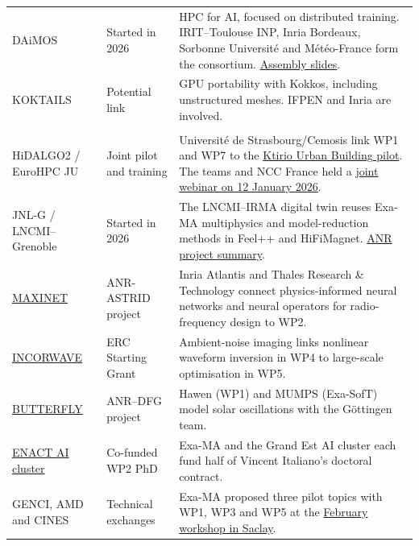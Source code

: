 \begin{longtable}{@{}
  >{\raggedright\arraybackslash}p{}
  >{\raggedright\arraybackslash}p{}
  >{\raggedright\arraybackslash}p{}@{}}
DAiMOS & Started in 2026 &
HPC for AI, focused on distributed training. IRIT--Toulouse INP,
Inria Bordeaux, Sorbonne Université and Météo-France form the
consortium. \href{https://numpex.org/wp-content/uploads/sites/6/2026/02/2026-01-21-2-DAIMOS.pdf}{Assembly
slides}.\\[1pt]

KOKTAILS & Potential link &
GPU portability with Kokkos, including unstructured meshes. IFPEN
and Inria are involved.\\

\addlinespace
\multicolumn{3}{@{}l@{}}{\textbf{Research programmes and facilities}}\\*
HiDALGO2 / EuroHPC JU & Joint pilot and training &
Université de Strasbourg/Cemosis link WP1 and WP7 to the \href{https://www.hidalgo2.eu/urban-building-model/}{Ktirio Urban
Building pilot}. The teams and NCC France held a
\href{https://exa-ma.numpex.fr/training.html}{joint webinar on 12 January 2026}.\\[1pt]

JNL-G / LNCMI--Grenoble & Started in 2026 &
The LNCMI--IRMA digital twin reuses Exa-MA multiphysics and
model-reduction methods in Feel++ and HiFiMagnet.
\href{https://anr.fr/Project-ANR-25-CE46-1157}{ANR project summary}.\\[1pt]

\href{https://anr.fr/Project-ANR-24-ASTR-0005}{MAXINET} & ANR-ASTRID project &
Inria Atlantis and Thales Research \& Technology connect physics-informed
neural networks and neural operators for radio-frequency design to WP2.\\[1pt]

\href{https://cordis.europa.eu/project/id/101116288}{INCORWAVE} &
ERC Starting Grant &
Ambient-noise imaging links nonlinear waveform inversion in WP4
to large-scale optimisation in WP5.\\[1pt]

\href{https://makutu.fr/fr/news/workshop-butterfly/}{BUTTERFLY} &
ANR--DFG project &
Hawen (WP1) and MUMPS (Exa-SofT) model solar oscillations
with the Göttingen team.\\[1pt]

\href{https://cluster-ia-enact.ai/}{ENACT AI cluster} & Co-funded WP2 PhD &
Exa-MA and the Grand Est AI cluster each fund half of Vincent
Italiano's doctoral contract.\\[1pt]

GENCI, AMD and CINES & Technical exchanges &
Exa-MA proposed three pilot topics with WP1, WP3 and WP5 at the
\href{https://exa-ma.numpex.fr/news/archive.html}{February workshop
in Saclay}.\\

\end{longtable}
\endgroup
